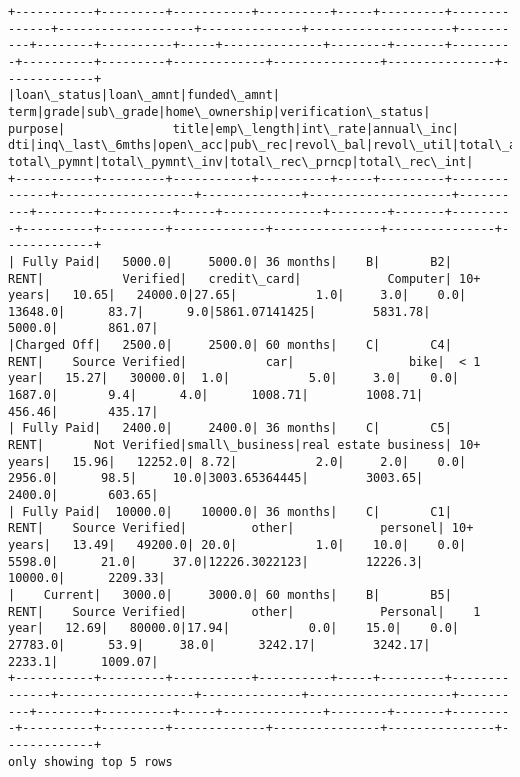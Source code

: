 \documentclass[11pt]{article}
\begin{document}
    \begin{Verbatim}[commandchars=\\\{\}]
+-----------+---------+-----------+----------+-----+---------+--------------+-------------------+--------------+--------------------+----------+--------+----------+-----+--------------+--------+-------+---------+----------+---------+-------------+---------------+---------------+-------------+
|loan\_status|loan\_amnt|funded\_amnt|      term|grade|sub\_grade|home\_ownership|verification\_status|       purpose|               title|emp\_length|int\_rate|annual\_inc|  dti|inq\_last\_6mths|open\_acc|pub\_rec|revol\_bal|revol\_util|total\_acc|  total\_pymnt|total\_pymnt\_inv|total\_rec\_prncp|total\_rec\_int|
+-----------+---------+-----------+----------+-----+---------+--------------+-------------------+--------------+--------------------+----------+--------+----------+-----+--------------+--------+-------+---------+----------+---------+-------------+---------------+---------------+-------------+
| Fully Paid|   5000.0|     5000.0| 36 months|    B|       B2|          RENT|           Verified|   credit\_card|            Computer| 10+ years|   10.65|   24000.0|27.65|           1.0|     3.0|    0.0|  13648.0|      83.7|      9.0|5861.07141425|        5831.78|         5000.0|       861.07|
|Charged Off|   2500.0|     2500.0| 60 months|    C|       C4|          RENT|    Source Verified|           car|                bike|  < 1 year|   15.27|   30000.0|  1.0|           5.0|     3.0|    0.0|   1687.0|       9.4|      4.0|      1008.71|        1008.71|         456.46|       435.17|
| Fully Paid|   2400.0|     2400.0| 36 months|    C|       C5|          RENT|       Not Verified|small\_business|real estate business| 10+ years|   15.96|   12252.0| 8.72|           2.0|     2.0|    0.0|   2956.0|      98.5|     10.0|3003.65364445|        3003.65|         2400.0|       603.65|
| Fully Paid|  10000.0|    10000.0| 36 months|    C|       C1|          RENT|    Source Verified|         other|            personel| 10+ years|   13.49|   49200.0| 20.0|           1.0|    10.0|    0.0|   5598.0|      21.0|     37.0|12226.3022123|        12226.3|        10000.0|      2209.33|
|    Current|   3000.0|     3000.0| 60 months|    B|       B5|          RENT|    Source Verified|         other|            Personal|    1 year|   12.69|   80000.0|17.94|           0.0|    15.0|    0.0|  27783.0|      53.9|     38.0|      3242.17|        3242.17|         2233.1|      1009.07|
+-----------+---------+-----------+----------+-----+---------+--------------+-------------------+--------------+--------------------+----------+--------+----------+-----+--------------+--------+-------+---------+----------+---------+-------------+---------------+---------------+-------------+
only showing top 5 rows


    \end{Verbatim}
\end{document}
